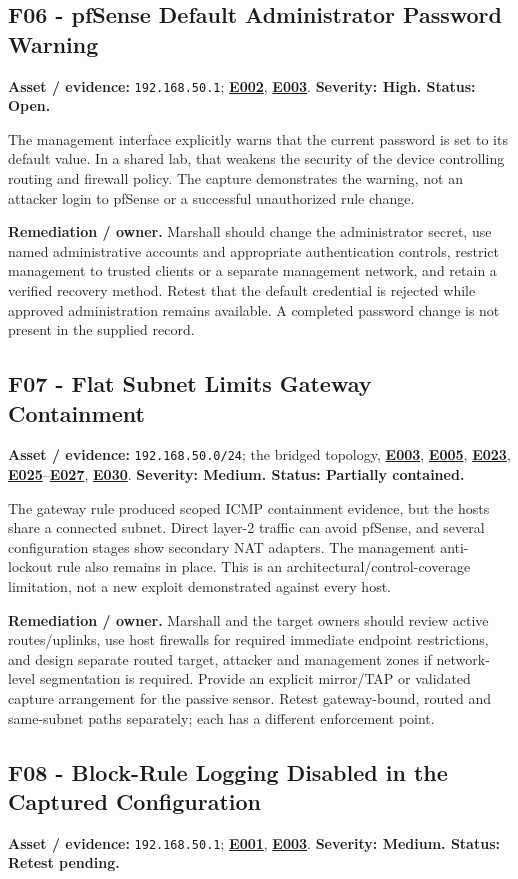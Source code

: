 \documentclass[11pt,a4paper]{article}
\newcommand{\ev}[1]{\hyperref[ev:#1]{\textbf{#1}}}
\begin{document}
\subsection{F06 - pfSense Default Administrator Password Warning}
\textbf{Asset / evidence:} \texttt{192.168.50.1}; \ev{E002}, \ev{E003}. \textbf{Severity: High. Status: Open.}

The management interface explicitly warns that the current password is set to its default value. In a shared lab, that weakens the security of the device controlling routing and firewall policy. The capture demonstrates the warning, not an attacker login to pfSense or a successful unauthorized rule change.

\textbf{Remediation / owner.} Marshall should change the administrator secret, use named administrative accounts and appropriate authentication controls, restrict management to trusted clients or a separate management network, and retain a verified recovery method. Retest that the default credential is rejected while approved administration remains available. A completed password change is not present in the supplied record.

\subsection{F07 - Flat Subnet Limits Gateway Containment}
\textbf{Asset / evidence:} \texttt{192.168.50.0/24}; the bridged topology, \ev{E003}, \ev{E005}, \ev{E023}, \ev{E025}--\ev{E027}, \ev{E030}. \textbf{Severity: Medium. Status: Partially contained.}

The gateway rule produced scoped ICMP containment evidence, but the hosts share a connected subnet. Direct layer-2 traffic can avoid pfSense, and several configuration stages show secondary NAT adapters. The management anti-lockout rule also remains in place. This is an architectural/control-coverage limitation, not a new exploit demonstrated against every host.

\textbf{Remediation / owner.} Marshall and the target owners should review active routes/uplinks, use host firewalls for required immediate endpoint restrictions, and design separate routed target, attacker and management zones if network-level segmentation is required. Provide an explicit mirror/TAP or validated capture arrangement for the passive sensor. Retest gateway-bound, routed and same-subnet paths separately; each has a different enforcement point.

\subsection{F08 - Block-Rule Logging Disabled in the Captured Configuration}
\textbf{Asset / evidence:} \texttt{192.168.50.1}; \ev{E001}, \ev{E003}. \textbf{Severity: Medium. Status: Retest pending.}
\end{document}
